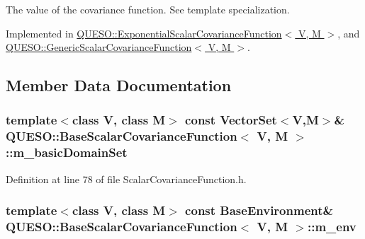 The value of the covariance function. See template specialization. 



Implemented in \hyperlink{class_q_u_e_s_o_1_1_exponential_scalar_covariance_function_ad65cfe1440c9045718bc57827d6fb551}{Q\-U\-E\-S\-O\-::\-Exponential\-Scalar\-Covariance\-Function$<$ V, M $>$}, and \hyperlink{class_q_u_e_s_o_1_1_generic_scalar_covariance_function_ab02d90f973034672b84888c941230a8c}{Q\-U\-E\-S\-O\-::\-Generic\-Scalar\-Covariance\-Function$<$ V, M $>$}.



\subsection{Member Data Documentation}
\hypertarget{class_q_u_e_s_o_1_1_base_scalar_covariance_function_a1060392114362022e427678d0f97ab12}{
\subsubsection[{m\-\_\-basic\-Domain\-Set}]{\setlength{\rightskip}{0pt plus 5cm}template$<$class V, class M$>$ const {\bf Vector\-Set}$<$V,M$>$\& {\bf Q\-U\-E\-S\-O\-::\-Base\-Scalar\-Covariance\-Function}$<$ V, M $>$\-::m\-\_\-basic\-Domain\-Set\hspace{0.3cm}{\ttfamily [protected]}}}\label{class_q_u_e_s_o_1_1_base_scalar_covariance_function_a1060392114362022e427678d0f97ab12}


Definition at line 78 of file Scalar\-Covariance\-Function.\-h.

\hypertarget{class_q_u_e_s_o_1_1_base_scalar_covariance_function_a2a100016b480c498b5219fb937d62543}{
\subsubsection[{m\-\_\-env}]{\setlength{\rightskip}{0pt plus 5cm}template$<$class V, class M$>$ const {\bf Base\-Environment}\& {\bf Q\-U\-E\-S\-O\-::\-Base\-Scalar\-Covariance\-Function}$<$ V, M $>$\-::m\-\_\-env\hspace{0.3cm}{\ttfamily [protected]}}}\label{class_q_u_e_s_o_1_1_base_scalar_covariance_function_a2a100016b480c498b5219fb937d62543}


